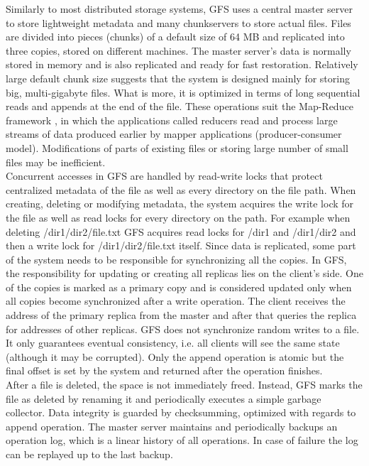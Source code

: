 \documentclass{pracamgren}
\begin{document}
Similarly to most distributed storage systems, GFS uses a central master server to store lightweight metadata and many chunkservers to store actual files. Files are divided into pieces (chunks) of a default size of 64 MB and replicated into three copies, stored on different machines. The master server's data is normally stored in memory and is also replicated and ready for fast restoration. Relatively large default chunk size suggests that the system is designed mainly for storing big, multi-gigabyte files. What is more, it is optimized in terms of long sequential reads and appends at the end of the file. These operations suit the Map-Reduce framework \cite{mapreduce}, in which the applications called reducers read and process large streams of data produced earlier by mapper applications (producer-consumer model). Modifications of parts of existing files or storing large number of small files may be inefficient.\\

Concurrent accesses in GFS are handled by read-write locks that protect centralized metadata of the file as well as every directory on the file path. When creating, deleting or modifying metadata, the system acquires the write lock for the file as well as read locks for every directory on the path. For example when deleting /dir1/dir2/file.txt GFS acquires read locks for /dir1 and /dir1/dir2 and then a write lock for /dir1/dir2/file.txt itself. Since data is replicated, some part of the system needs to be responsible for synchronizing all the copies. In GFS, the responsibility for updating or creating all replicas lies on the client's side. One of the copies is marked as a primary copy and is considered updated only when all copies become synchronized after a write operation. The client receives the address of the primary replica from the master and after that queries the replica for addresses of other replicas. GFS does not synchronize random writes to a file. It only guarantees eventual consistency, i.e. all clients will see the same state (although it may be corrupted). Only the append operation is atomic but the final offset is set by the system and returned after the operation finishes.\\

After a file is deleted, the space is not immediately freed. Instead, GFS marks the file as deleted by renaming it and periodically executes a simple garbage collector. Data integrity is guarded by checksumming, optimized with regards to append operation. The master server maintains and periodically backups an operation log, which is a linear history of all operations. In case of failure the log can be replayed up to the last backup.\\
\end{document}
